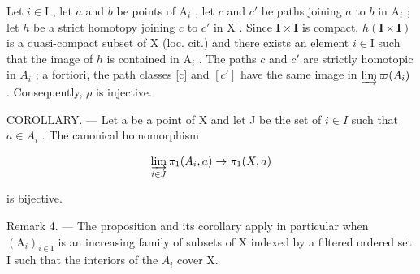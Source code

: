 Let \(i \in \mathrm{I}\) , let \(a\) and \(b\) be points of \(\mathrm{A}_i\) , let \(c\) and \(c'\) be paths joining \(a\) to \(b\) in \(\mathrm{A}_i\) ; let \(h\) be a strict homotopy joining \(c\) to \(c'\) in \(\mathrm{X}\) . Since \(\mathbf{I} \times \mathbf{I}\) is compact, \(h(\mathbf{I} \times \mathbf{I})\) is a quasi-compact subset of \(\mathrm{X}\) (loc. cit.) and there exists an element \(i \in \mathrm{I}\) such that the image of \(h\) is contained in \(\mathrm{A}_i\) . The paths \(c\) and \(c'\) are strictly homotopic in \(A_{i}\) ; a fortiori, the path classes {[}c{]} and \([c']\) have the same image in \(\varinjlim\varpi(A_{i})\) . Consequently, \(\rho\) is injective.

COROLLARY. --- Let a be a point of X and let J be the set of \(i \in I\) such that \(a \in A_{i}\) . The canonical homomorphism

\[
\varinjlim_ {i \in J} \pi_ {1} (A _ {i}, a) \to \pi_ {1} (X, a)
\]

is bijective.

Remark 4. --- The proposition and its corollary apply in particular when \((\mathrm{A}_{i})_{i\in\mathrm{I}}\) is an increasing family of subsets of X indexed by a filtered ordered set I such that the interiors of the \(A_{i}\) cover X.

